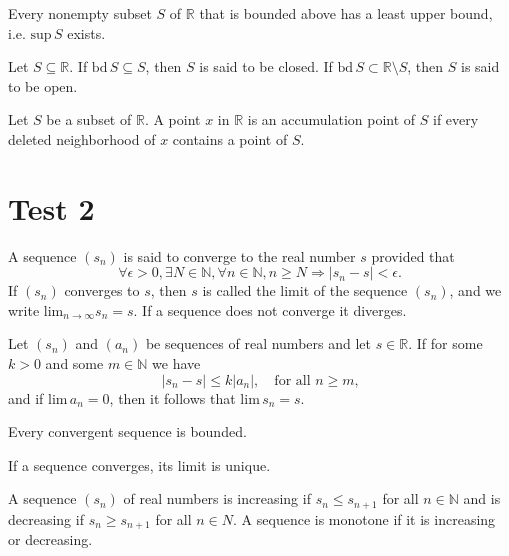 \documentclass[nobib,notoc]{tufte-handout}
\begin{document}
\begin{axiom}
	Every nonempty subset \(S\) of \(\mathbb{R}\) that is bounded above has a least upper bound, i.e. \(\text{sup}\,S\) exists.
\end{axiom}
\begin{defi}
	Let \(S\subseteq\mathbb{R}\). If \(\text{bd}\,S\subseteq S\), then \(S\) is said to be closed. If \(\text{bd}\,S\subset\mathbb{R}\setminus S\), then \(S\) is said to be open.
\end{defi}
\begin{defi}
	Let \(S\) be a subset of \(\mathbb{R}\). A point \(x\) in \(\mathbb{R}\) is an accumulation point of \(S\) if every deleted neighborhood of \(x\) contains a point of \(S\).
\end{defi}
\section{Test 2}
\begin{defi}[Convergence]
	A sequence \((s_n)\) is said to converge to the real number \(s\) provided that
	\begin{equation*}
		\forall\epsilon>0,\exists N\in\mathbb{N},\forall n\in\mathbb{N},n\geq N\Rightarrow \lvert s_n-s\rvert<\epsilon.
	\end{equation*}
	If \((s_n)\) converges to \(s\), then \(s\) is called the limit of the sequence \((s_n)\), and we write \(\text{lim}_{n\rightarrow\infty}s_n=s\). If a sequence does not converge it diverges.
\end{defi}
\begin{thm}
	Let \((s_n)\) and \((a_n)\) be sequences of real numbers and let \(s\in\mathbb{R}\). If for some \(k>0\) and some \(m\in\mathbb{N}\) we have
	\begin{equation*}
		\lvert s_n-s\rvert\leq k\lvert a_n\rvert,\quad\text{for all \(n\geq m\),}
	\end{equation*}
	and if \(\text{lim}\,a_n=0\), then it follows that \(\text{lim}\,s_n=s\).
\end{thm}
\begin{thm}
	Every convergent sequence is bounded.
\end{thm}
\begin{thm}
	If a sequence converges, its limit is unique.
\end{thm}
\begin{defi}
	A sequence \((s_n)\) of real numbers is increasing if \(s_n\leq s_{n+1}\) for all \(n\in\mathbb{N}\) and is decreasing if \(s_n\geq s_{n+1}\) for all \(n\in N\). A sequence is monotone if it is increasing or decreasing.
\end{defi}
\end{document}
